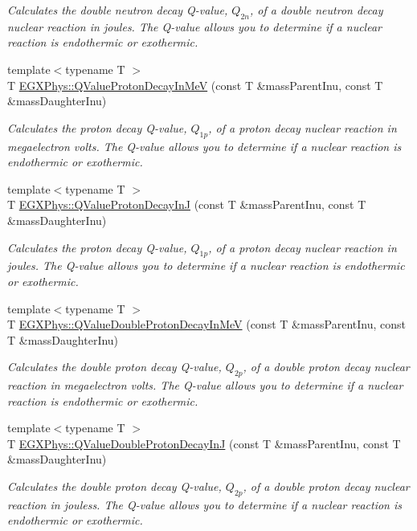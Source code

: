 \begin{DoxyCompactItemize}
\begin{DoxyCompactList}\small\item\em Calculates the double neutron decay Q-\/value, $Q_{2n}$, of a double neutron decay nuclear reaction in joules. The Q-\/value allows you to determine if a nuclear reaction is endothermic or exothermic. \end{DoxyCompactList}\item 
{\footnotesize template$<$typename T $>$ }\\T \hyperlink{group___q_value_ga514354518df3bf1cde561b6d75879ef0}{E\+G\+X\+Phys\+::\+Q\+Value\+Proton\+Decay\+In\+MeV} (const T \&mass\+Parent\+Inu, const T \&mass\+Daughter\+Inu)
\begin{DoxyCompactList}\small\item\em Calculates the proton decay Q-\/value, $Q_{1p}$, of a proton decay nuclear reaction in megaelectron volts. The Q-\/value allows you to determine if a nuclear reaction is endothermic or exothermic. \end{DoxyCompactList}\item 
{\footnotesize template$<$typename T $>$ }\\T \hyperlink{group___q_value_gaa344322393356bd442d17c992628218a}{E\+G\+X\+Phys\+::\+Q\+Value\+Proton\+Decay\+InJ} (const T \&mass\+Parent\+Inu, const T \&mass\+Daughter\+Inu)
\begin{DoxyCompactList}\small\item\em Calculates the proton decay Q-\/value, $Q_{1p}$, of a proton decay nuclear reaction in joules. The Q-\/value allows you to determine if a nuclear reaction is endothermic or exothermic. \end{DoxyCompactList}\item 
{\footnotesize template$<$typename T $>$ }\\T \hyperlink{group___q_value_ga4a57c8901e92918f08bee52493b81c59}{E\+G\+X\+Phys\+::\+Q\+Value\+Double\+Proton\+Decay\+In\+MeV} (const T \&mass\+Parent\+Inu, const T \&mass\+Daughter\+Inu)
\begin{DoxyCompactList}\small\item\em Calculates the double proton decay Q-\/value, $Q_{2p}$, of a double proton decay nuclear reaction in megaelectron volts. The Q-\/value allows you to determine if a nuclear reaction is endothermic or exothermic. \end{DoxyCompactList}\item 
{\footnotesize template$<$typename T $>$ }\\T \hyperlink{group___q_value_ga64a3867f65de5586feab99527bb03d31}{E\+G\+X\+Phys\+::\+Q\+Value\+Double\+Proton\+Decay\+InJ} (const T \&mass\+Parent\+Inu, const T \&mass\+Daughter\+Inu)
\begin{DoxyCompactList}\small\item\em Calculates the double proton decay Q-\/value, $Q_{2p}$, of a double proton decay nuclear reaction in jouless. The Q-\/value allows you to determine if a nuclear reaction is endothermic or exothermic. \end{DoxyCompactList}\end{DoxyCompactItemize}


